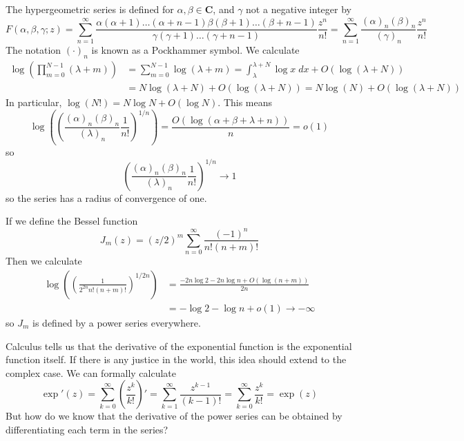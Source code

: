 \begin{example}
    The hypergeometric series is defined for $\alpha, \beta \in \mathbf{C}$, and $\gamma$ not a negative integer by
    \[ F(\alpha,\beta,\gamma;z) = \sum_{n = 1}^\infty \frac{\alpha(\alpha+1)\dots(\alpha + n - 1) \beta(\beta + 1) \dots (\beta + n - 1)}{\gamma (\gamma + 1) \dots (\gamma + n - 1)} \frac{z^n}{n!} = \sum_{n = 1}^\infty \frac{(\alpha)_n (\beta)_n}{(\gamma)_n} \frac{z^n}{n!} \]
    The notation $(\cdot)_n$ is known as a Pockhammer symbol. We calculate
    \begin{align*}
        \log \left( \prod_{m = 0}^{N-1} (\lambda + m) \right) &= \sum_{m = 0}^{N-1} \log(\lambda + m) = \int_\lambda^{\lambda + N} \log x\; dx + O(\log(\lambda + N))\\
        &= N \log(\lambda + N) + O(\log(\lambda + N)) = N \log(N) + O(\log(\lambda + N))
    \end{align*}
    In particular, $\log(N!) = N \log N + O(\log N)$. This means
    \[ \log \left( \left( \frac{(\alpha)_n (\beta)_n}{(\lambda)_n} \frac{1}{n!} \right)^{1/n} \right) = \frac{O(\log(\alpha + \beta + \lambda + n))}{n} = o(1) \]
    so
    \[ \left( \frac{(\alpha)_n (\beta)_n}{(\lambda)_n} \frac{1}{n!} \right)^{1/n} \to 1 \]
    so the series has a radius of convergence of one.
\end{example}

\begin{example}
    If we define the Bessel function
    \[ J_m(z) = (z/2)^m \sum_{n = 0}^\infty \frac{(-1)^n}{n! (n+m)!} \]
    Then we calculate
    \begin{align*}
        \log \left( \left( \frac{1}{2^{2n} n! (n+m)!} \right)^{1/2n} \right) &= \frac{-2n \log 2 - 2n \log n + O(\log(n+m))}{2n}\\
        &= - \log 2 - \log n + o(1) \to -\infty
    \end{align*}
    so $J_m$ is defined by a power series everywhere.
\end{example}

Calculus tells us that the derivative of the exponential function is the exponential function itself. If there is any justice in the world, this idea should extend to the complex case. We can formally calculate
%
\[ \exp'(z) = \sum_{k = 0}^\infty \left( \frac{z^k}{k!} \right)' = \sum_{k = 1}^\infty \frac{z^{k-1}}{(k-1)!} = \sum_{k = 0}^\infty \frac{z^k}{k!} = \exp(z) \]
%
But how do we know that the derivative of the power series can be obtained by differentiating each term in the series?

